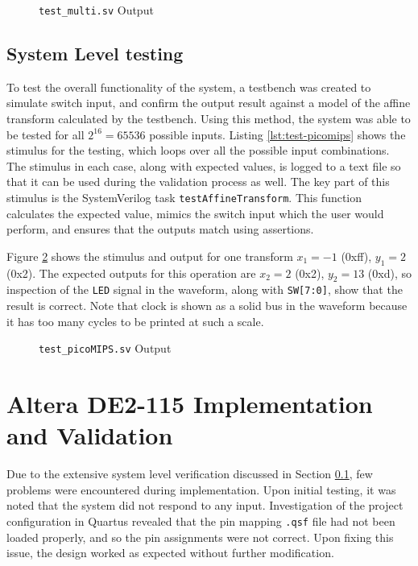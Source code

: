 

\begin{figure}[ht]
	\centering
	
	\caption{\texttt{test\_multi.sv} Output}
	\label{fig:test-multi}
\end{figure}

\subsection{System Level testing} \label{sec:sys-level-testing}

To test the overall functionality of the system, a testbench was created to simulate switch input, and confirm the output result against a model of the affine transform calculated by the testbench. Using this method, the system was able to be tested for all $2^{16} = 65536$ possible inputs. Listing \ref{lst:test-picomips} shows the stimulus for the testing, which loops over all the possible input combinations. The stimulus in each case, along with expected values, is logged to a text file so that it can be used during the validation process as well. The key part of this stimulus is the SystemVerilog task \texttt{testAffineTransform}. This function calculates the expected value, mimics the switch input which the user would perform, and ensures that the outputs match using assertions.

Figure \ref{fig:test-picomips} shows the stimulus and output for one transform $x_1 = -1$ (0xff), $y_1 = 2$ (0x2). The expected outputs for this operation are $x_2 = 2$ (0x2), $y_2 = 13$ (0xd), so inspection of the \texttt{LED} signal in the waveform, along with \texttt{SW[7:0]}, show that the result is correct. Note that clock is shown as a solid bus in the waveform because it has too many cycles to be printed at such a scale.



\begin{figure}[ht]
	\centering
	
	\caption{\texttt{test\_picoMIPS.sv} Output}
	\label{fig:test-picomips}
\end{figure}

\section{Altera DE2-115 Implementation and Validation} \label{sec:implementation}
Due to the extensive system level verification discussed in Section \ref{sec:sys-level-testing}, few problems were encountered during implementation. Upon initial testing, it was noted that the system did not respond to any input. Investigation of the project configuration in Quartus revealed that the pin mapping \texttt{.qsf} file had not been loaded properly, and so the pin assignments were not correct. Upon fixing this issue, the design worked as expected without further modification.

